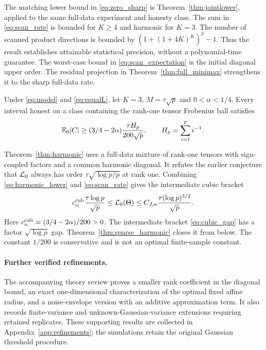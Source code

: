 The matching lower bound in \eqref{eq:zero_sharp} is Theorem~\ref{thm:jointlower}, applied to the same full-data experiment and honesty class. The sum in \eqref{eq:scan_rate} is bounded for $K\ge4$ and harmonic for $K=3$. The number of scanned product directions is bounded by $(1+(1+4K)^K)^p-1$. Thus the result establishes attainable statistical precision, without a polynomial-time guarantee. The worst-case bound in \eqref{eq:scan_expectation} is the initial diagonal upper order. The residual projection in Theorem~\ref{thm:full_minimax} strengthens it to the sharp full-data rate.

\begin{theorem}\label{thm:harmonic}
Under \eqref{eq:model} and \eqref{eq:equalL}, let $K=3$, $M=\tau\sqrt p$ and $0<\alpha<1/4$. Every interval honest on a class containing the rank-one tensor Frobenius ball satisfies
\begin{equation}\label{eq:harmonic_lower}
 \mathbb E_0|C|\ge
 (3/4-2\alpha)\frac{\tau H_p}{200\sqrt p},
 \qquad H_p=\sum_{i=1}^p i^{-1}.
\end{equation}
\end{theorem}

Theorem~\ref{thm:harmonic} uses a full-data mixture of rank-one tensors with sign-coupled factors and a common harmonic diagonal. It refutes the earlier conjecture that $\mathcal L_0$ always has order $\tau\sqrt{\log p/p}$ at rank one. Combining \eqref{eq:harmonic_lower} and \eqref{eq:scan_rate} gives the intermediate cubic bracket
\begin{equation}\label{eq:cubic_gap}
 c_\alpha^{\rm cub}\frac{\tau\log p}{\sqrt p}
 \le\mathcal L_0(\Theta)
 \le C_{J,\alpha}\frac{\tau(\log p)^{3/2}}{\sqrt p}.
\end{equation}
Here $c_\alpha^{\rm cub}=(3/4-2\alpha)/200>0$. The intermediate bracket \eqref{eq:cubic_gap} has a factor $\sqrt{\log p}$ gap. Theorem~\ref{thm:sparse_harmonic} closes it from below. The constant $1/200$ is conservative and is not an optimal finite-sample constant.

\paragraph{Further verified refinements.}
The accompanying theory review proves a smaller rank coefficient in the diagonal bound, an exact one-dimensional characterization of the optimal fixed affine radius, and a noise-envelope version with an additive approximation term. It also records finite-variance and unknown-Gaussian-variance extensions requiring retained replicates. These supporting results are collected in Appendix~\ref{app:refinements}; the simulations retain the original Gaussian threshold procedure.

